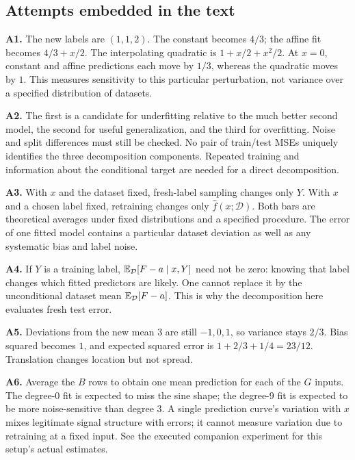 \subsection*{Attempts embedded in the text}
\textbf{A1.} The new labels are $(1,1,2)$. The constant becomes $4/3$; the affine fit becomes $4/3+x/2$. The interpolating quadratic is $1+x/2+x^2/2$. At $x=0$, constant and affine predictions each move by $1/3$, whereas the quadratic moves by $1$. This measures sensitivity to this particular perturbation, not variance over a specified distribution of datasets.

\textbf{A2.} The first is a candidate for underfitting relative to the much better second model, the second for useful generalization, and the third for overfitting. Noise and split differences must still be checked. No pair of train/test MSEs uniquely identifies the three decomposition components. Repeated training and information about the conditional target are needed for a direct decomposition.

\textbf{A3.} With $x$ and the dataset fixed, fresh-label sampling changes only $Y$. With $x$ and a chosen label fixed, retraining changes only $\hat f(x;\mathcal D)$. Both bars are theoretical averages under fixed distributions and a specified procedure. The error of one fitted model contains a particular dataset deviation as well as any systematic bias and label noise.

\textbf{A4.} If $Y$ is a training label, $\mathbb{E}_{\mathcal D}[F-a\mid x,Y]$ need not be zero: knowing that label changes which fitted predictors are likely. One cannot replace it by the unconditional dataset mean $\mathbb{E}_{\mathcal D}[F-a]$. This is why the decomposition here evaluates fresh test error.

\textbf{A5.} Deviations from the new mean $3$ are still $-1,0,1$, so variance stays $2/3$. Bias squared becomes $1$, and expected squared error is $1+2/3+1/4=23/12$. Translation changes location but not spread.

\textbf{A6.} Average the $B$ rows to obtain one mean prediction for each of the $G$ inputs. The degree-0 fit is expected to miss the sine shape; the degree-9 fit is expected to be more noise-sensitive than degree 3. A single prediction curve's variation with $x$ mixes legitimate signal structure with errors; it cannot measure variation due to retraining at a fixed input. See the executed companion experiment for this setup's actual estimates.

